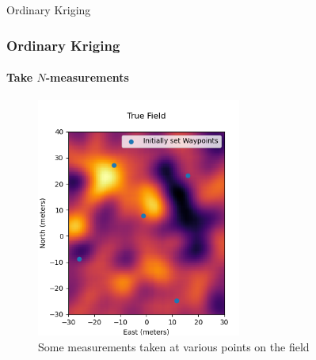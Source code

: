 \documentclass[professionalfont,10pt]{beamer}
\begin{document}
	\begin{frame}[t]{Ordinary Kriging}
		\frametitle{Ordinary Kriging}
		\framesubtitle{Take $N$-measurements}
		\hskip-0.75cm
		\begin{minipage}[t]{0.2\linewidth}\vspace{-0.5cm}
			\tiny\tableofcontents[currentsection,currentsubsection,hideothersubsections,subsectionstyle=show/shaded]
		\end{minipage}
		\hfill%
		\begin{minipage}[t]{0.86\linewidth}\vspace{-0.5cm}
			\begin{figure}[t]
				\centering
				\captionsetup{width=0.9\textwidth}
				\includegraphics[width=0.6\textwidth]{../images/MeasurementsOnField.png}
				\caption{Some measurements taken at various points on the field}
			\end{figure}
		\end{minipage}
		\vfill%
	\end{frame}
\end{document}
